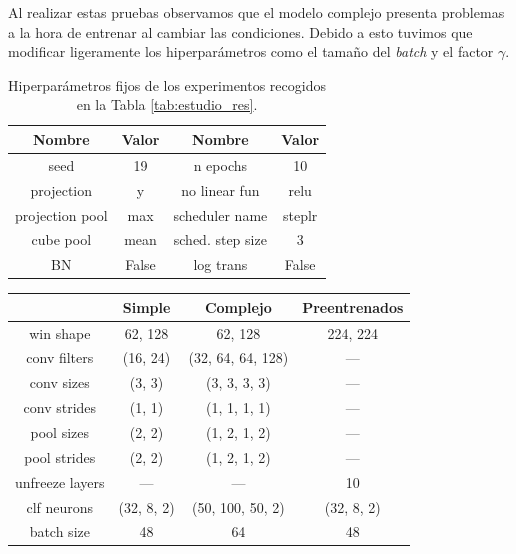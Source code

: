 \documentclass[a4paper,12pt,oneside,titlepage]{book}
\begin{document}
\begin{appendices}
  Al realizar estas pruebas observamos que el modelo complejo presenta problemas a la hora de entrenar al cambiar las condiciones. Debido a esto tuvimos que modificar ligeramente los hiperparámetros como el tamaño del \textit{batch} y el factor $\gamma$.

  \begin{table}[h!]
    \centering
    \begin{tabular}{|c|c||c|c|}
    \hline
    Nombre          & Valor & Nombre           & Valor  \\ \hline\hline
    seed            & 19    & n epochs         & 10     \\ \hline
    projection      & y     & no linear fun    & relu   \\ \hline
    projection pool & max   & scheduler name   & steplr \\ \hline
    cube pool       & mean  & sched. step size & 3      \\ \hline
    BN              & False & log trans        & False  \\ \hline
    \end{tabular}
    \caption{Hiperparámetros fijos de los experimentos recogidos en la Tabla \ref{tab:estudio_res}.}
    \label{tab:anexo_res_1}
  \end{table}
  \begin{table}[h!]
    \centering
    \begin{tabular}{|c|c|c|c|}
    \hline
                    & Simple     & Complejo          & Preentrenados \\ \hline\hline
    win shape       & 62, 128    & 62, 128           & 224, 224      \\ \hline
    conv filters    & (16, 24)   & (32, 64, 64, 128) & ---           \\ \hline
    conv sizes      & (3, 3)     & (3, 3, 3, 3)      & ---           \\ \hline
    conv strides    & (1, 1)     & (1, 1, 1, 1)      & ---           \\ \hline
    pool sizes      & (2, 2)     & (1, 2, 1, 2)      & ---           \\ \hline
    pool strides    & (2, 2)     & (1, 2, 1, 2)      & ---           \\ \hline
    unfreeze layers & ---        & ---               & 10            \\ \hline
    clf neurons     & (32, 8, 2) & (50, 100, 50, 2)  & (32, 8, 2)    \\ \hline
    batch size      & 48         & 64                & 48            \\ \hline

\end{tabular}
\end{table}
\end{appendices}
\end{document}

